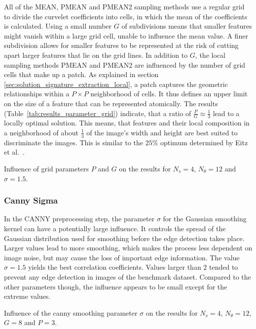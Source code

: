 All of the MEAN, PMEAN and PMEAN2 sampling methods use a regular grid to divide
the curvelet coefficients into cells, in which the mean of the coefficients is
calculated. Using a small number $G$ of subdivisions means that smaller
features might vanish within a large grid cell, unable to influence the mean
value. A finer subdivision allows for smaller features to be represented at the
risk of cutting apart larger features that lie on the grid lines. In addition
to $G$, the local sampling methods PMEAN and PMEAN2 are influenced by the
number of grid cells that make up a patch. As explained in section
\ref{sec:solution_signature_extraction_local}, a patch captures the geometric
relationships within a $P \times P$ neighborhood of cells. It thus defines an
upper limit on the size of a feature that can be represented atomically. The
results (Table~\ref{tab:results_parameter_grid}) indicate, that a ratio of
$\frac{P}{G} \approx \frac{1}{3}$ lead to a locally optimal solution. This
means, that features and their local composition in a neighborhood of about
$\frac{1}{3}$ of the image's width and height are best suited to discriminate
the images. This is similar to the $25\%$ optimum determined by Eitz et al.\
\autocite{eitz_sketch-based_2010}.

\begin{table}[h]
    \centering
    \resultsparametergrid
    \caption[Grid Size Parameter Results]{
        Influence of grid parameters $P$ and $G$ on the results for $N_s=4$,
        $N_{\theta}=12$ and $\sigma=1.5$.
    }
    \label{tab:results_parameter_grid}
\end{table}

\FloatBarrier
\subsubsection{Canny Sigma}

In the CANNY preprocessing step, the parameter $\sigma$ for the Gaussian
smoothing kernel can have a potentially large influence. It controls the spread
of the Gaussian distribution used for smoothing before the edge detection takes
place. Larger values lead to more smoothing, which makes the process less
dependent on image noise, but may cause the loss of important edge information.
The value $\sigma = 1.5$ yields the best correlation coefficients. Values
larger than $2$ tended to prevent any edge detection in images of the benchmark
dataset. Compared to the other parameters though, the influence appears to be
small except for the extreme values.

\begin{table}[h]
    \centering
    \resultsparametercanny
    \caption[Canny Parameter Results]{
        Influence of the canny smoothing parameter $\sigma$ on the results for
        $N_s=4$, $N_{\theta}=12$, $G=8$ and $P=3$.
    }
    \label{tab:results_parameter_canny}
\end{table}

\FloatBarrier
